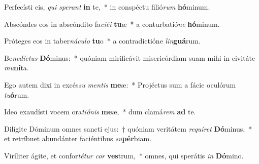 \item Perfecísti eis, \textit{qui} \textit{spe}\textit{rant} \textbf{in} te,~* in conspéctu filió\textit{rum} \textbf{hó}minum.
\item Abscóndes eos in abscóndito fa\textit{ci}\textit{é}\textit{i} \textbf{tu}æ~* a conturbatió\textit{ne} \textbf{hó}minum.
\item Próteges eos in taber\textit{ná}\textit{cu}\textit{lo} \textbf{tu}o~* a contradictióne \textit{lin}\textbf{guá}rum.
\item Be\textit{ne}\textit{díc}\textit{tus} \textbf{Dó}minus:~* quóniam mirificávit misericórdiam suam mihi in civitáte \textit{mu}\textbf{ní}ta.
\item Ego autem dixi in excés\textit{su} \textit{men}\textit{tis} \textbf{me}æ:~* Projéctus sum a fácie oculórum \textit{tu}\textbf{ó}rum.
\item Ideo exaudísti vocem ora\textit{ti}\textit{ó}\textit{nis} \textbf{me}æ,~* dum clamá\textit{rem} \textbf{ad} te.
\item Dilígite Dóminum omnes sancti ejus:~† quóniam veritátem \textit{re}\textit{quí}\textit{ret} \textbf{Dó}minus,~* et retríbuet abundánter faciéntibus \textit{su}\textbf{pér}biam.
\item Viríliter ágite, et confor\textit{té}\textit{tur} \textit{cor} \textbf{ves}trum,~* omnes, qui sperátis \textit{in} \textbf{Dó}mino.
